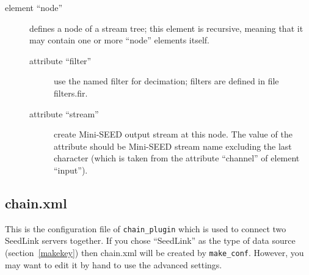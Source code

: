 \documentclass[11pt,a4paper,titlepage]{article}
\begin{document}
\begin{description}
\begin{description}
\begin{description}
\begin{description}
\item[element ``node''] defines a node of a stream tree; this element is
recursive, meaning that it may contain one or more ``node'' elements
itself.

\begin{description}
\item[attribute ``filter''] use the named filter for decimation; filters
are defined in file filters.fir.

\item[attribute ``stream''] create Mini-SEED output stream at this node.
The value of the attribute should be Mini-SEED stream name excluding the
last character (which is taken from the attribute ``channel'' of element
``input'').
\end{description}

\end{description}

\end{description}

\end{description}

\end{description}


\subsection{chain.xml}\label{chainxml}

This is the configuration file of \verb+chain_plugin+ which is used to
connect two SeedLink servers together. If you chose ``SeedLink'' as the
type of data source (section~\ref{makekey}) then chain.xml will be created
by \verb+make_conf+. However, you may want to edit it by hand to use the
advanced settings.
\end{document}
